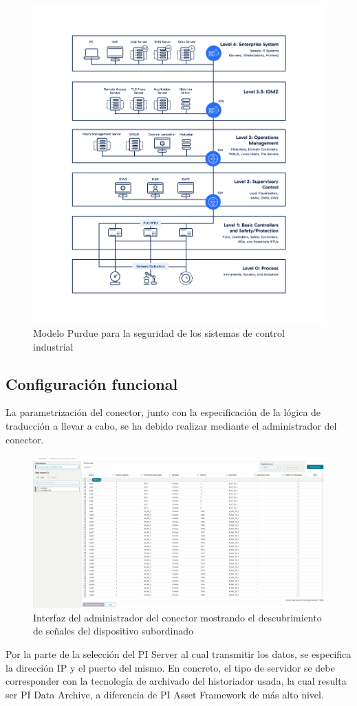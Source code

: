 \begin{figure}
\centering
\includegraphics[width=0.5\linewidth]{figures/modelo-purdue.png}
\caption{Modelo Purdue para la seguridad de los sistemas de control industrial}
\label{fig:modelo-purdue}
\end{figure}

\subsection{Configuración funcional}
\label{makereference3.4.3}

La parametrización del conector, junto con la especificación de la lógica de traducción a llevar a cabo, se ha debido realizar mediante el administrador del conector.

\begin{figure}
\centering
\includegraphics[width=0.5\linewidth]{figures/administador-del-conector.png}
\caption{Interfaz del administrador del conector mostrando el descubrimiento de señales del dispositivo subordinado}
\label{fig:administador-del-conector}
\end{figure}

Por la parte de la selección del PI Server al cual transmitir los datos, se especifica la dirección IP y el puerto del mismo. En concreto, el tipo de servidor se debe corresponder con la tecnología de archivado del historiador usada, la cual resulta ser PI Data Archive, a diferencia de PI Asset Framework de más alto nivel.

